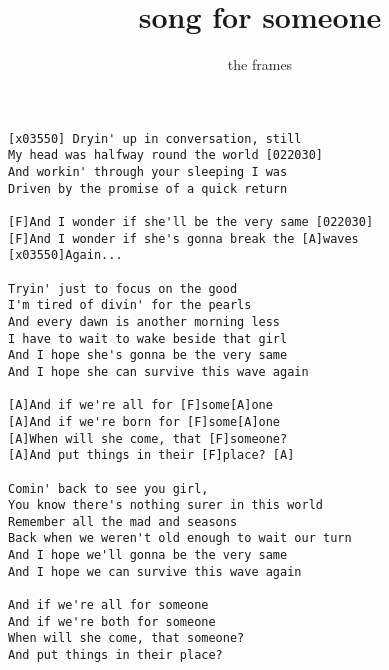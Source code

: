 \author{the frames}
\title{song for someone}
\maketitle
\begin{verbatim}
[x03550] Dryin' up in conversation, still
My head was halfway round the world [022030]
And workin' through your sleeping I was
Driven by the promise of a quick return

[F]And I wonder if she'll be the very same [022030]
[F]And I wonder if she's gonna break the [A]waves
[x03550]Again...

Tryin' just to focus on the good
I'm tired of divin' for the pearls
And every dawn is another morning less
I have to wait to wake beside that girl
And I hope she's gonna be the very same
And I hope she can survive this wave again

[A]And if we're all for [F]some[A]one
[A]And if we're born for [F]some[A]one
[A]When will she come, that [F]someone?
[A]And put things in their [F]place? [A]

Comin' back to see you girl,
You know there's nothing surer in this world
Remember all the mad and seasons
Back when we weren't old enough to wait our turn
And I hope we'll gonna be the very same
And I hope we can survive this wave again

And if we're all for someone
And if we're both for someone
When will she come, that someone?
And put things in their place?
\end{verbatim}